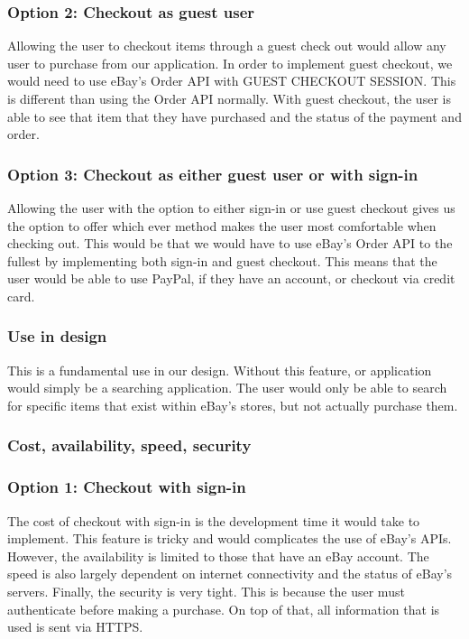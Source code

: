 \documentclass[journal,compsoc, 10pt, draftclsnofoot, onecolumn]{IEEEtran}
\begin{document}
\subsubsection*{Option 2: Checkout as guest user}
Allowing the user to checkout items through a guest check out would allow any
user to purchase from our application. In order to implement guest checkout, we
would need to use eBay's Order API with GUEST CHECKOUT SESSION. This is
different than using the Order API normally. With guest checkout, the user is
able to see that item that they have purchased and the status of the payment and
 order.

\subsubsection*{Option 3: Checkout as either guest user or with sign-in}
Allowing the user with the option to either sign-in or use guest checkout gives
us the option to offer which ever method makes the user most comfortable when
checking out. This would be that we would have to use eBay's Order API to the
fullest by implementing both sign-in and guest checkout. This means that the
user would be able to use PayPal, if they have an account, or checkout via
credit card.

\subsubsection*{Use in design}
This is a fundamental use in our design. Without this feature, or application
would simply be a searching application. The user would only be able to search
for specific items that exist within eBay's stores, but not actually purchase
them.

\subsubsection*{Cost, availability, speed, security}
\subsubsection*{Option 1: Checkout with sign-in}
The cost of checkout with sign-in is the development time it would take to
implement. This feature is tricky and would complicates the use of eBay's APIs.
However, the availability is limited to those that have an eBay account. The
speed is also largely dependent on internet connectivity and the status of
eBay's servers. Finally, the security is very tight. This is because the user
must authenticate before making a purchase. On top of that, all information that 
is used is sent via HTTPS.
\end{document}
